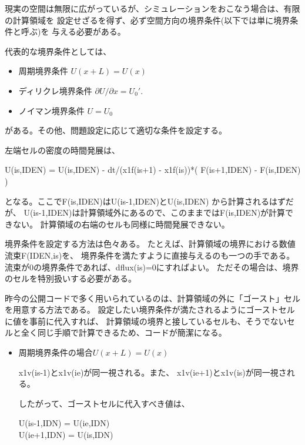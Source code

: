 {現実の空間は無限に広がっているが、シミュレーションをおこなう場合は、有限の計算領域を
設定せざるを得ず、必ず空間方向の境界条件(以下では単に境界条件と呼ぶ)を
与える必要がある。

代表的な境界条件としては、
\begin{itemize}
    \item 周期境界条件 $U(x+L) = U(x)$

    \item ディリクレ境界条件 $\partial U/\partial x=U_0'$.

    \item ノイマン境界条件 $U=U_0$
\end{itemize}
がある。その他、問題設定に応じて適切な条件を設定する。

左端セルの密度の時間発展は、
\begin{screen}
{\ttfamily
\small
  U(is,IDEN) = U(is,IDEN) - dt/(x1f(is+1) - x1f(is))*( F(is+1,IDEN) - F(is,IDEN) )
}
\end{screen}
となる。ここで{\ttfamily F(is,IDEN)}は{\ttfamily U(is-1,IDEN)}と{\ttfamily U(is,IDEN)}
から計算されるはずだが、
{\ttfamily U(is-1,IDEN)}は計算領域外にあるので、このままでは{\ttfamily F(is,IDEN)}が計算できない。
計算領域の右端のセルも同様に時間発展できない。

境界条件を設定する方法は色々ある。
たとえば、計算領域の境界における数値流束{\ttfamily F(IDEN,is)}を、
境界条件を満たすように直接与えるのも一つの手である。
流束が0の境界条件であれば、{\ttfamily dflux(is)=0}にすればよい。
ただその場合は、境界のセルを特別扱いする必要がある。

昨今の公開コードで多く用いられているのは、計算領域の外に「ゴースト」セルを用意する方法である。
設定したい境界条件が満たされるようにゴーストセルに値を事前に代入すれば、
計算領域の境界と接しているセルも、そうでないセルと全く同じ手順で計算できるため、コードが簡潔になる。

\begin{itemize}
    \item 周期境界条件の場合$U(x+L)=U(x)$

        {\ttfamily x1v(is-1)}と{\ttfamily x1v(ie)}が同一視される。また、
        {\ttfamily x1v(ie+1)}と{\ttfamily x1v(is)}が同一視される。

        したがって、ゴーストセルに代入すべき値は、
        \begin{screen}
                {\ttfamily U(is-1,IDN) = U(ie,IDN)} \\
                {\ttfamily U(ie+1,IDN) = U(is,IDN)}
        \end{screen}


\end{itemize}}
